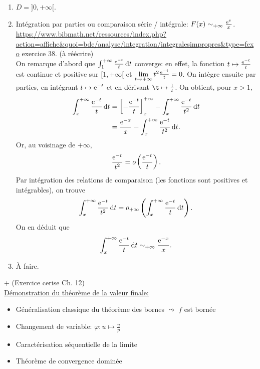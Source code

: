\begin{elem_solution}
    \begin{enumerate}
        \item $D = ]0, + \infty[$.
        \item Intégration par parties ou comparaison série / intégrale: $F(x) \sim_{+\infty} \frac{\mathrm{e}^{x}}{x}$. \\
        \url{https://www.bibmath.net/ressources/index.php?action=affiche&quoi=bde/analyse/integration/integralesimpropres&type=fexo} exercice 38. (à réécrire)\\
        On remarque d'abord que $\int_{1}^{+\infty} \frac{\mathrm{e}^{-t}}{t} \, \mathrm{d} t$ converge: en effet, la fonction $t \mapsto \frac{\mathrm{e}^{-t}}{t}$ est continue et positive sur $[1, + \infty[$ et $\lim\limits_{t \to +\infty} t^2 \frac{\mathrm{e}^{-t}}{t} = 0$. On intègre ensuite par parties, en intégrant $t \mapsto \mathrm{e}^{-t}$ et en dérivant $\t \mapsto \frac{1}{t}$. On obtient, pour $x > 1$, 
        \begin{align*}
            \int_x^{+ \infty} \frac{\mathrm{e}^{-t}}{t} \, \mathrm{d} t &= \left[ -\frac{\mathrm{e}^{-t}}{t} \right]_x^{+\infty} - \int_x^{+\infty} \frac{\mathrm{e}^{-t}}{t^2} \, \mathrm{d} t \\
            &= \frac{\mathrm{e}^{-x}}{x} - \int_x^{+\infty} \frac{\mathrm{e}^{-t}}{t^2} \, \mathrm{d} t.
        \end{align*}
        Or, au voisinage de $+ \infty$, 
        $$\frac{\mathrm{e}^{-t}}{t^2} = o\left( \frac{\mathrm{e}^{-t}}{t} \right).$$
        Par intégration des relations de comparaison (les fonctions sont positives et intégrables), on trouve
        $$\int_x^{+\infty} \frac{\mathrm{e}^{-t}}{t^2} \, \mathrm{d} t = o_{+\infty} \left( \int_x^{+\infty} \frac{\mathrm{e}^{-t}}{t} \, \mathrm{d} t \right).$$
        On en déduit que
        $$\int_x^{+\infty} \frac{\mathrm{e}^{-t}}{t} \, \mathrm{d} t \sim_{+\infty} \frac{\mathrm{e}^{-x}}{x}.$$
        \item À faire.
    \end{enumerate}
\end{elem_solution}

\cite{exos_oraux} + \cite{acamanes} (Exercice cerise Ch. 12) \\
\underline{Démonstration du théorème de la valeur finale:}
\begin{itemize}
    \item Généralisation classique du théorème des bornes $\leadsto$ $f$ est bornée
    \item Changement de variable: $\varphi: u \mapsto \frac{u}{p}$
    \item Caractérisation séquentielle de la limite
    \item Théorème de convergence dominée
\end{itemize}
